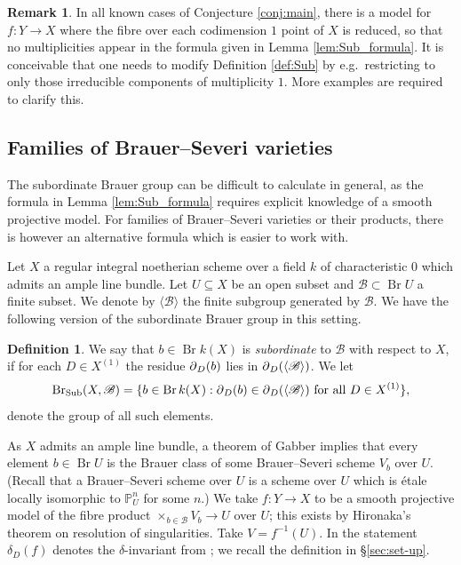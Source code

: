 \documentclass[a4paper,12pt,reqno]{amsart}
\numberwithin{equation}{section} \numberwithin{figure}{section}
\DeclareMathOperator{\Br}{Br} \DeclareMathOperator{\Brnr}{Br_{nr}}
\renewcommand\P{\mathbb{P}}
\newcommand{\br}{\mathscr{B}}
\renewcommand{\#}{\sharp}
\theoremstyle{definition}
\newtheorem{definition}[lemma]{Definition}
\newtheorem{remark}[lemma]{Remark}
\numberwithin{lemma}{section}
\begin{document}
\begin{remark}
	In all known cases of Conjecture \ref{conj:main}, there is a model for $f: Y \to X$
	where the fibre over each codimension $1$ point of $X$ is reduced, so that
	no multiplicities appear in the formula given in Lemma \ref{lem:Sub_formula}.
	It is conceivable that one needs to modify Definition \ref{def:Sub}
	by e.g.~restricting to only those irreducible
	components of multiplicity $1$. More examples are required to clarify
	this.
\end{remark}


\subsection{Families of Brauer--Severi varieties} \label{sec:family_BS}
The subordinate Brauer group can be difficult to calculate in general, as the formula in Lemma \ref{lem:Sub_formula} requires explicit knowledge of a smooth projective model. For families of Brauer--Severi varieties or their products, there is however an alternative formula which is easier to work with.

Let $X$ a regular integral noetherian scheme over a field $k$ of characteristic $0$ which admits an ample line bundle. Let $U \subseteq X$ be an open subset and $\br \subset \Br U$ a finite subset. We denote by $\langle \br \rangle$ the finite subgroup generated by $\br$. We have the following version of the subordinate Brauer group in this setting.

\begin{definition} \label{def:br_Sub}
	We say that $b \in \Br k(X)$ is \emph{subordinate} to $\br$
	with respect to $X$, if for each $D \in X^{(1)}$ the residue $\operatorname{\partial}_D(b)$ lies in 
	$\res_D(\langle\br \rangle)$. We let
	$$\Sub(X,\br)=\{ b \in \Br k(X) : \res_D(b) \in \res_D(\langle\br\rangle) \text{ for all } D \in X^{(1)}\},$$
	denote the group of all such elements.
\end{definition}


As $X$ admits an ample line bundle, a theorem of Gabber \cite[Thm.~4.2.1]{Brauer} implies that every element $b \in \Br U$ is the Brauer class of some Brauer--Severi scheme $V_b$  over $U$. (Recall that a Brauer--Severi scheme over $U$ is a scheme over $U$ which is \'etale locally isomorphic to $\P^n_U$ for some $n$.) We take $f:Y \to X$ to be a smooth projective model of the fibre product $\times_{b \in \br} V_b \to U$ over $U$; this exists by Hironaka's theorem on resolution of singularities. Take $V= f^{-1}(U)$. In the statement $\delta_D(f)$ denotes the $\delta$-invariant from \cite{LS16}; we recall the definition in \S \ref{sec:set-up}.
\end{document}
